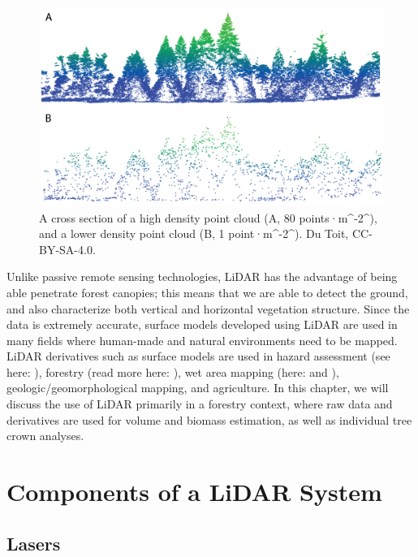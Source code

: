 \documentclass[
]{book}
\begin{document}
\begin{figure}
\includegraphics[width=0.8\linewidth]{images/15-high-low-point-density} \caption{A cross section of a high density point cloud (A, 80 points·m^-2^), and a lower density point cloud (B, 1 point·m^-2^). Du Toit, CC-BY-SA-4.0.}\label{fig:15-high-low-point-density}
\end{figure}

Unlike passive remote sensing technologies, LiDAR has the advantage of being able penetrate forest canopies; this means that we are able to detect the ground, and also characterize both vertical and horizontal vegetation structure. Since the data is extremely accurate, surface models developed using LiDAR are used in many fields where human-made and natural environments need to be mapped. LiDAR derivatives such as surface models are used in hazard assessment (see here: \citet{jaboyedoff_use_2012}), forestry (read more here: \citet{goodbody_airborne_2021}), wet area mapping (here: \citet{eash_stream-channel_2018} and \citet{zurqani_evaluating_2020}), geologic/geomorphological mapping, and agriculture. In this chapter, we will discuss the use of LiDAR primarily in a forestry context, where raw data and derivatives are used for volume and biomass estimation, as well as individual tree crown analyses.

\section{Components of a LiDAR System}\label{components-of-a-lidar-system}

\subsection{Lasers}\label{lasers}
\end{document}
